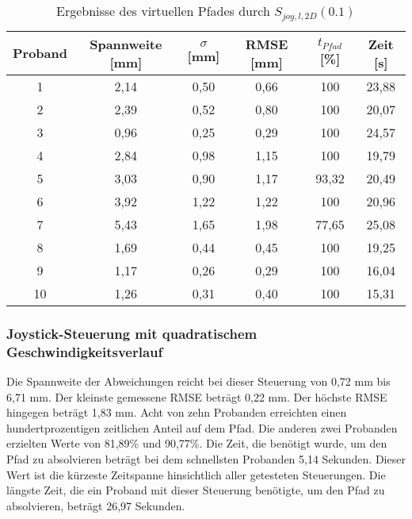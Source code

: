 \begin{table}[htb]
	\caption{Ergebnisse des virtuellen Pfades durch $S_{joy,l,2D}(0.1)$}
	\label{table pfad v k0}
	\begin{center}
		\begin{tabular}{|c|c|c|c|c|c|}
			\hline 
			Proband & Spannweite [mm] & $\sigma$ [mm] & RMSE [mm] & $t_{Pfad}$ [\%] & Zeit [s] \\ 
			\hline 	
			1 & 2,14 & 0,50 & 0,66 & 100 & 23,88  \\ 
			\hline
			2 & 2,39 & 0,52 & 0,80 & 100 & 20,07  \\ 
			\hline
			3 & 0,96 & 0,25 & 0,29 & 100 & 24,57  \\ 
			\hline 
			4 & 2,84 & 0,98 & 1,15 & 100 & 19,79  \\ 
			\hline 
			5 & 3,03 & 0,90 & 1,17 & 93,32 & 20,49  \\ 
			\hline 
			6 & 3,92 & 1,22 & 1,22 & 100 & 20,96  \\ 
			\hline 
			7 & 5,43 & 1,65 & 1,98 & 77,65 & 25,08  \\ 
			\hline 
			8 & 1,69 & 0,44 & 0,45 & 100 & 19,25  \\ 
			\hline 
			9 & 1,17 & 0,26 & 0,29 & 100 & 16,04  \\ 
			\hline 
			10 & 1,26 & 0,31 & 0,40 & 100 & 15,31  \\ 
			\hline 
		\end{tabular} 
	\end{center}
\end{table}

\subsubsection{Joystick-Steuerung mit quadratischem Geschwindigkeitsverlauf}
Die Spannweite der Abweichungen reicht bei dieser Steuerung von 0,72 mm bis 6,71 mm. Der kleinste gemessene RMSE beträgt 0,22 mm. Der höchste RMSE hingegen beträgt 1,83 mm. Acht von zehn Probanden erreichten einen hundertprozentigen zeitlichen Anteil auf dem Pfad. Die anderen zwei Probanden erzielten Werte von 81,89\% und 90,77\%. Die Zeit, die benötigt wurde, um den Pfad zu absolvieren beträgt bei dem schnellsten Probanden 5,14 Sekunden. Dieser Wert ist die kürzeste Zeitspanne hinsichtlich aller getesteten Steuerungen. Die längste Zeit, die ein Proband mit dieser Steuerung benötigte, um den Pfad zu absolvieren, beträgt 26,97 Sekunden.

